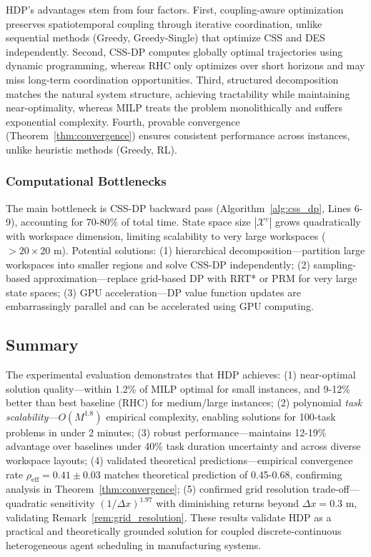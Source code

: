 \documentclass[manuscript,screen,review]{acmart}
\begin{document}
HDP's advantages stem from four factors. First, coupling-aware optimization 
preserves spatiotemporal coupling through iterative coordination, unlike 
sequential methods (Greedy, Greedy-Single) that optimize CSS and DES 
independently. Second, CSS-DP computes globally optimal trajectories using 
dynamic programming, whereas RHC only optimizes over short horizons and may 
miss long-term coordination opportunities. Third, structured decomposition 
matches the natural system structure, achieving tractability while maintaining 
near-optimality, whereas MILP treats the problem monolithically and suffers 
exponential complexity. Fourth, provable convergence (Theorem~\ref{thm:convergence}) 
ensures consistent performance across instances, unlike heuristic methods 
(Greedy, RL).

\subsubsection{Computational Bottlenecks}

The main bottleneck is CSS-DP backward pass (Algorithm~\ref{alg:css_dp}, 
Lines 6-9), accounting for 70-80\% of total time. State space size 
$|\mathcal{X}^c|$ grows quadratically with workspace dimension, limiting 
scalability to very large workspaces ($> 20 \times 20$ m). Potential solutions: 
(1) hierarchical decomposition—partition large workspaces into smaller regions 
and solve CSS-DP independently; (2) sampling-based approximation—replace 
grid-based DP with RRT* or PRM for very large state spaces; (3) GPU 
acceleration—DP value function updates are 
embarrassingly parallel and can be accelerated using GPU computing.

\subsection{Summary}

The experimental evaluation demonstrates that HDP achieves: (1) near-optimal
solution quality—within 1.2\% of MILP optimal for small instances, and 9-12\%
better than best baseline (RHC) for medium/large instances; (2) polynomial
\textit{task scalability}—$O(M^{1.8})$ empirical complexity, enabling solutions 
for 100-task problems in under 2 minutes; (3) robust performance—maintains 
12-19\% advantage over baselines under 40\% task duration uncertainty and across 
diverse workspace layouts; (4) validated theoretical predictions—empirical 
convergence rate $\rho_{\text{eff}} = 0.41 \pm 0.03$ matches theoretical 
prediction of 0.45-0.68, confirming analysis in Theorem~\ref{thm:convergence}; 
(5) confirmed grid resolution trade-off—quadratic sensitivity $(1/\Delta x)^{1.97}$ 
with diminishing returns beyond $\Delta x = 0.3$ m, validating 
Remark~\ref{rem:grid_resolution}. These results validate HDP as a practical 
and theoretically grounded solution for coupled discrete-continuous heterogeneous 
agent scheduling in manufacturing systems.
\end{document}

